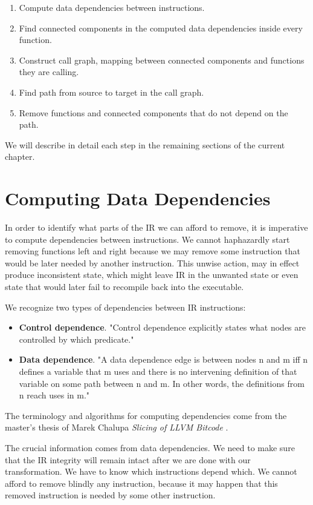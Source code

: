 \documentclass[12pt, twoside]{fithesis2}
\renewcommand{\_}{\leavevmode \kern0.07em\vbox{\hrule width0.4em}}
\newcommand{\squarebullet}{\textcolor{black}{\raisebox{0.15em}{\rule{4pt}{4pt}}}}
\newenvironment{myItemize}{
  \begin{itemize}[
    leftmargin=2em,
    rightmargin=1em,
    itemsep=\parskip,
    parsep=0em,
    topsep=0em,
    partopsep=0em
]
  \renewcommand{\labelitemi}{\squarebullet}
  \renewcommand{\labelitemii}{\textbullet}
}{
  \end{itemize}
}
\newenvironment{myEnumerate}{
  \begin{enumerate}[
    leftmargin=2em,
    rightmargin=1em,
    itemsep=\parskip,
    parsep=0em,
    topsep=0em,
    partopsep=0em
]
}{
  \end{enumerate}
}
\begin{document}
\begin{myEnumerate}
\item Compute data dependencies between instructions.
\item Find connected components in the computed data dependencies inside
every function.
\item Construct call graph, mapping between connected components and functions
they are calling.
\item Find path from source to target in the call graph.
\item Remove functions and connected components that do not depend on the
path.
\end{myEnumerate}

We will describe in detail each step in the remaining sections of the current
chapter.

\section{Computing Data Dependencies}
\label{sec:design-dep}

In order to identify what parts of the IR we can afford to remove, it is
imperative to compute dependencies between instructions. We cannot haphazardly
start removing functions left and right because we may remove some instruction
that would be later needed by another instruction.
This unwise action, may in effect produce inconsistent state, which might leave
IR in the unwanted state or even state that would later fail to recompile back
into the executable.

We recognize two types of dependencies between IR instructions:

\begin{myItemize}
\item \textbf{Control dependence}. "Control dependence explicitly states what nodes are
controlled by which predicate."
\item \textbf{Data dependence}. "A data dependence edge is between nodes n and m iff n
defines a variable that m uses and there is no intervening definition of that
variable on some path between n and m. In other words, the definitions from n
reach uses in m."
\end{myItemize}

The terminology and algorithms for computing dependencies come from the
master's thesis of Marek Chalupa \textit{Slicing of LLVM Bitcode} \cite{dg}.

The crucial information comes from data dependencies. We need to make sure that
the IR integrity will remain intact after we are done with our transformation.
We have to know which instructions depend which. We cannot afford to remove
blindly any instruction, because it may happen that this removed instruction is
needed by some other instruction.
\end{document}

